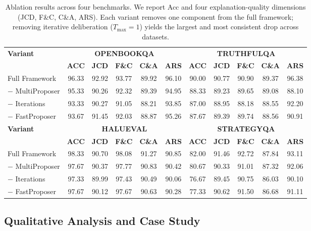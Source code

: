 \documentclass{article}
\begin{document}
\begin{table}[t]
\caption{Ablation results across four benchmarks. We report Acc and four explanation-quality dimensions (JCD, F\&C, C\&A, ARS). Each variant removes one component from the full framework; removing iterative deliberation ($T_{\max}=1$) yields the largest and most consistent drop across datasets.}
\label{tab:ablation}
\centering
\setlength{\tabcolsep}{4.5pt}
\begin{tabular}{l|ccccc|ccccc}
\toprule
\multirow{2}{*}{\textbf{Variant}} &
\multicolumn{5}{c|}{\textbf{OPENBOOKQA}} &
\multicolumn{5}{c}{\textbf{TRUTHFULQA}}  \\
\cmidrule(lr){2-6} \cmidrule(lr){7-11}
& \textbf{ACC} & \textbf{JCD} & \textbf{F\&C} & \textbf{C\&A} & \textbf{ARS}
& \textbf{ACC} & \textbf{JCD} & \textbf{F\&C} & \textbf{C\&A} & \textbf{ARS} \\
\midrule
Full Framework   & 96.33 & 92.92 & 93.77 & 89.92 & 96.10 & 90.00 & 90.77 & 90.90 & 89.37 & 96.38 \\
$-$ MultiProposer& 95.33 & 90.26 & 92.32 & 89.39 & 94.95 & 88.33 & 89.23 & 89.65 & 89.08 & 88.10 \\
$-$ Iterations   & 93.33 & 90.27 & 91.05 & 88.21 & 93.85 & 87.00 & 88.95 & 88.18 & 88.55 & 92.20 \\
$-$ FastProposer & 93.67 & 91.45 & 92.03 & 88.87 & 95.26 & 87.67 & 89.39 & 89.74 & 88.56 & 90.91 \\
\midrule
\multirow{2}{*}{\textbf{Variant}} &
\multicolumn{5}{c|}{\textbf{HALUEVAL}} &
\multicolumn{5}{c}{\textbf{STRATEGYQA}} \\
\cmidrule(lr){2-6} \cmidrule(lr){7-11}
& \textbf{ACC} & \textbf{JCD} & \textbf{F\&C} & \textbf{C\&A} & \textbf{ARS}
& \textbf{ACC} & \textbf{JCD} & \textbf{F\&C} & \textbf{C\&A} & \textbf{ARS} \\
\midrule
Full Framework   & 98.33 & 90.70 & 98.08 & 91.27 & 90.85 & 82.00 & 91.46 & 92.72 & 87.84 & 93.11 \\
$-$ MultiProposer& 97.67 & 90.37 & 97.77 & 90.83 & 90.42 & 80.67 & 90.33 & 91.01 & 87.32 & 92.06 \\
$-$ Iterations   & 97.33 & 89.99 & 97.43 & 90.49 & 90.06 & 76.67 & 89.45 & 90.75 & 86.03 & 90.10 \\
$-$ FastProposer & 97.67 & 90.12 & 97.67 & 90.63 & 90.28 & 77.33 & 90.62 & 91.50 & 86.68 & 91.11 \\
\bottomrule
\end{tabular}
\end{table}

\subsection{Qualitative Analysis and Case Study}
\label{subsec:qualitative_case_study}
\end{document}
